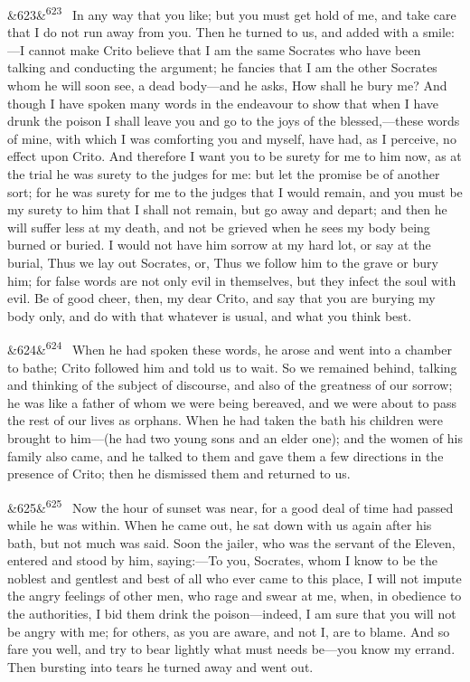\documentclass[12pt]{article}
\newcommand{\para}[1][]{\par\noindent\ifx&#1&\else\textsuperscript{\footnotesize #1}~\fi}
\begin{document}
\para[623] In any way that you like; but you must get hold of me, and take care that I do not run away from you. Then he turned to us, and added with a smile:---I cannot make Crito believe that I am the same Socrates who have been talking and conducting the argument; he fancies that I am the other Socrates whom he will soon see, a dead body---and he asks, How shall he bury me? And though I have spoken many words in the endeavour to show that when I have drunk the poison I shall leave you and go to the joys of the blessed,---these words of mine, with which I was comforting you and myself, have had, as I perceive, no effect upon Crito. And therefore I want you to be surety for me to him now, as at the trial he was surety to the judges for me: but let the promise be of another sort; for he was surety for me to the judges that I would remain, and you must be my surety to him that I shall not remain, but go away and depart; and then he will suffer less at my death, and not be grieved when he sees my body being burned or buried. I would not have him sorrow at my hard lot, or say at the burial, Thus we lay out Socrates, or, Thus we follow him to the grave or bury him; for false words are not only evil in themselves, but they infect the soul with evil. Be of good cheer, then, my dear Crito, and say that you are burying my body only, and do with that whatever is usual, and what you think best.

\para[624] When he had spoken these words, he arose and went into a chamber to bathe; Crito followed him and told us to wait. So we remained behind, talking and thinking of the subject of discourse, and also of the greatness of our sorrow; he was like a father of whom we were being bereaved, and we were about to pass the rest of our lives as orphans. When he had taken the bath his children were brought to him---(he had two young sons and an elder one); and the women of his family also came, and he talked to them and gave them a few directions in the presence of Crito; then he dismissed them and returned to us.

\para[625] Now the hour of sunset was near, for a good deal of time had passed while he was within. When he came out, he sat down with us again after his bath, but not much was said. Soon the jailer, who was the servant of the Eleven, entered and stood by him, saying:---To you, Socrates, whom I know to be the noblest and gentlest and best of all who ever came to this place, I will not impute the angry feelings of other men, who rage and swear at me, when, in obedience to the authorities, I bid them drink the poison---indeed, I am sure that you will not be angry with me; for others, as you are aware, and not I, are to blame. And so fare you well, and try to bear lightly what must needs be---you know my errand. Then bursting into tears he turned away and went out.
\end{document}
